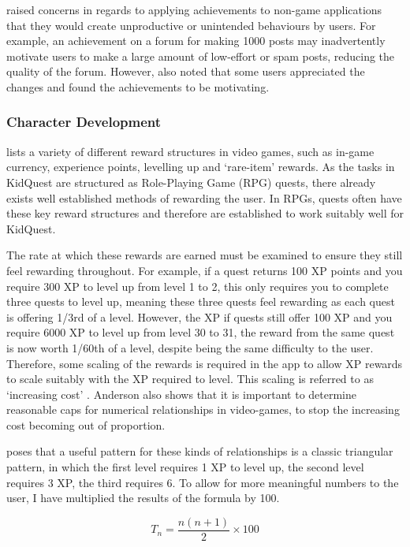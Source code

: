 \cite{Montola:2009:AGA:1621841.1621859} raised concerns in regards to applying achievements to non-game applications that they would create unproductive or unintended behaviours by users. 
For example, an achievement on a forum for making 1000 posts may inadvertently motivate users to make a large amount of low-effort or spam posts, reducing the quality of the forum.
However, \cite{Montola:2009:AGA:1621841.1621859} also noted that some users appreciated the changes and found the achievements to be motivating. 

\subsubsection{Character Development}
\cite{king2010video} lists a variety of different reward structures in video games, such as in-game currency, experience points, levelling up and `rare-item' rewards. 
As the tasks in KidQuest are structured as Role-Playing Game (RPG) quests, there already exists well established methods of rewarding the user. 
In RPGs, quests often have these key reward structures and therefore are established to work suitably well for KidQuest.

The rate at which these rewards are earned must be examined to ensure they still feel rewarding throughout. 
For example, if a quest returns 100 XP points and you require 300 XP to level up from level 1 to 2, this only requires you to complete three quests to level up, meaning these three quests feel rewarding as each quest is offering 1/3rd of a level.
However, the XP if quests still offer 100 XP and you require 6000 XP to level up from level 30 to 31, the reward from the same quest is now worth 1/60th of a level, despite being the same difficulty to the user.
Therefore, some scaling of the rewards is required in the app to allow XP rewards to scale suitably with the XP required to level.
This scaling is referred to as `increasing cost' \citep{1_anderson_2016}.
Anderson also shows that it is important to determine reasonable caps for numerical relationships in video-games, to stop the increasing cost becoming out of proportion.

\cite{1_anderson_2016} poses that a useful pattern for these kinds of relationships is a classic triangular pattern, in which the first level requires 1 XP to level up, the second level requires 3 XP, the third requires 6. To allow for more meaningful numbers to the user, I have multiplied the results of the formula by 100.

\begin{equation} \label{eq:xprequiredfornextlevel}
	T_n= \frac{n(n+1)}{2} \times 100
\end{equation}

